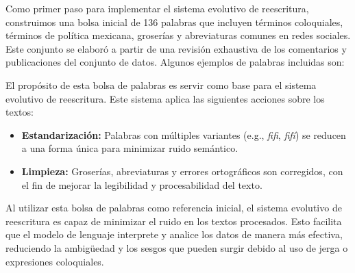 \documentclass[10pt, a4paper]{article}
\begin{document}
	
	Como primer paso para implementar el sistema evolutivo de reescritura, construimos una bolsa inicial de 136 palabras que incluyen términos coloquiales, términos de política mexicana, groserías y abreviaturas comunes en redes sociales. Este conjunto se elaboró a partir de una revisión exhaustiva de los comentarios y publicaciones del conjunto de datos. Algunos ejemplos de palabras incluidas son:
	
	\begin{table}[H]
		\centering
		\caption{Ejemplo de palabras incluidas en la bolsa inicial.}
		\label{tab:bolsa_palabras}
	\end{table}
	
	
	El propósito de esta bolsa de palabras es servir como base para el sistema evolutivo de reescritura. Este sistema aplica las siguientes acciones sobre los textos:
	\begin{itemize}
		\item \textbf{Estandarización:} Palabras con múltiples variantes (e.g., \textit{fifi}, \textit{fifí}) se reducen a una forma única para minimizar ruido semántico.
		\item \textbf{Limpieza:} Groserías, abreviaturas y errores ortográficos son corregidos, con el fin de mejorar la legibilidad y procesabilidad del texto.
	\end{itemize}
	
	Al utilizar esta bolsa de palabras como referencia inicial, el sistema evolutivo de reescritura es capaz de minimizar el ruido en los textos procesados. Esto facilita que el modelo de lenguaje interprete y analice los datos de manera más efectiva, reduciendo la ambigüedad y los sesgos que pueden surgir debido al uso de jerga o expresiones coloquiales.
	
\end{document}
